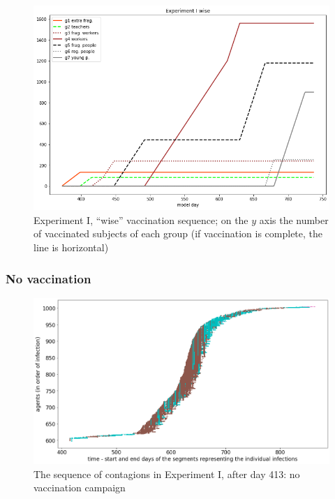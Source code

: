 \documentclass[graybox]{svmult}
\begin{document}
\begin{figure}[t]
\center
\includegraphics[scale=0.45]{Experiment_I_wiseVaccinationSequence.png} %

\caption{Experiment I, ``wise'' vaccination sequence; on the $y$ axis the number of vaccinated subjects of each group (if vaccination is complete, the line is horizontal)} 
\label{Experiment_I_wiseVaccinationSequence}
\end{figure}



\subsubsection{No vaccination}


\begin{figure}[t]
\center
\includegraphics[scale=0.3]{ExperimentForGA_I_base>413.png}

\caption{The sequence of contagions in Experiment I, after day 413: no vaccination campaign} 
\label{ExperimentForGA_I_base>413}
\end{figure}
\end{document}
